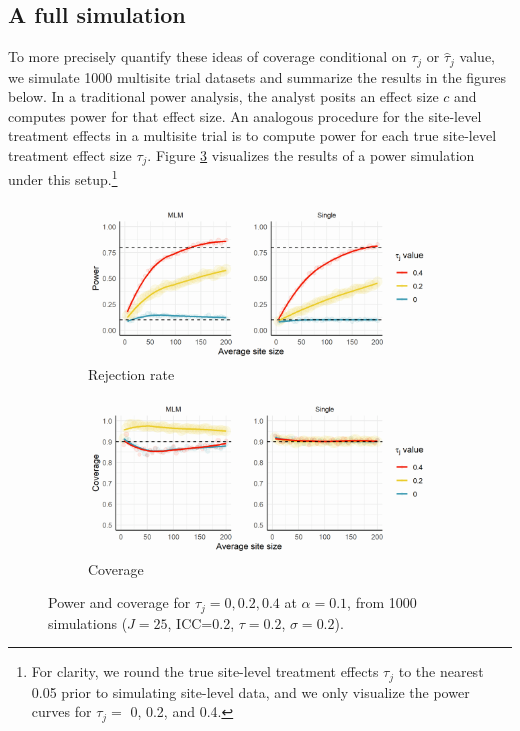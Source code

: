 \documentclass[]{article}
\begin{document}
\subsection{A full simulation}

To more precisely quantify these ideas of coverage conditional on $\tau_j$ or $\hat{\tau}_j$ value, we simulate 1000 multisite trial datasets and summarize the results in the figures below.
In a traditional power analysis, the analyst posits an effect size $c$ and computes power for that effect size.
An analogous procedure for the site-level treatment effects in a multisite trial is to compute power for each true site-level treatment effect size $\tau_j$.
Figure \ref{fig:pcp1} visualizes the results of a power simulation under this setup.\footnote{For clarity, we round the true site-level treatment effects $\tau_j$ to the nearest 0.05 prior to simulating site-level data, and we only visualize the power curves for $\tau_j =$ 0, 0.2, and 0.4.}
\begin{figure}[ht]
    \centering
    \begin{subfigure}[a]{\textwidth}
    	\includegraphics[width=\textwidth]{pp1}
        \caption{Rejection rate}
    	\label{fig:pp1}
    \end{subfigure}
    \vfill
    \begin{subfigure}[b]{\textwidth}
    	\includegraphics[width=\textwidth]{cp1}
        \caption{Coverage}
    	\label{fig:cp1}
    \end{subfigure}
    \caption{Power and coverage for $\tau_j = 0, 0.2, 0.4$ at $\alpha=0.1$, from 1000 simulations ($J=25$, ICC=0.2, $\tau=0.2$, $\sigma=0.2$).}
    \label{fig:pcp1}
\end{figure}
\end{document}
